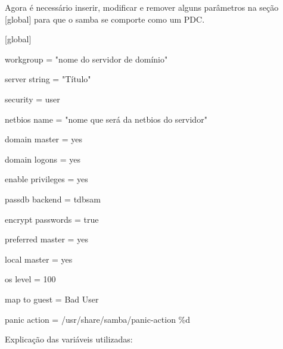 Agora é necessário inserir, modificar e remover alguns parâmetros na seção [global] para que o samba se comporte como um PDC.
{\raggedright

[global] 

	workgroup = "nome do servidor de domínio" 

	server string = "Título"       

	security = user

	netbios name = "nome que será da netbios do servidor"

	domain master = yes

	domain logons = yes

	enable privileges = yes

	passdb backend = tdbsam
	
	encrypt passwords = true

	preferred master = yes

	local master = yes

	os level = 100


	map to guest = Bad User

	panic action = /usr/share/samba/panic-action \%d
}

Explicação das variáveis utilizadas:

